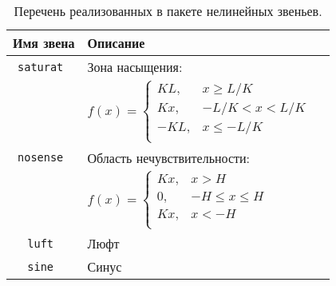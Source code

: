 


\begin{table}[ht]
  \centering
  \caption{Перечень реализованных в пакете нелинейных звеньев.}
  \label{tabl:nonlinear_functions}
  \begin{tabular}{|c|l|l|}
    \hline
    Имя звена & Описание \\
    \hline
    \tt saturat & Зона насыщения: \\
    & $f(x)=\left\{
      \begin{array}{rl}
        KL,  & x \ge L/K \\
        Kx,  & -L/K < x < L/K \\
        -KL,  & x \le -L/K \\
      \end{array}\right.$ \\
    \hline
    \tt nosense & Область нечувствительности: \\
    & $f(x)=\left\{
      \begin{array}{rl}
        Kx,  & x > H \\
        0,   & -H \le x \le H \\
        Kx, & x < -H \\
      \end{array}\right.$ \\
    \hline
    \tt luft & Люфт \\
    \hline
    \tt sine & Синус \\
    \hline
  \end{tabular}
\end{table}

